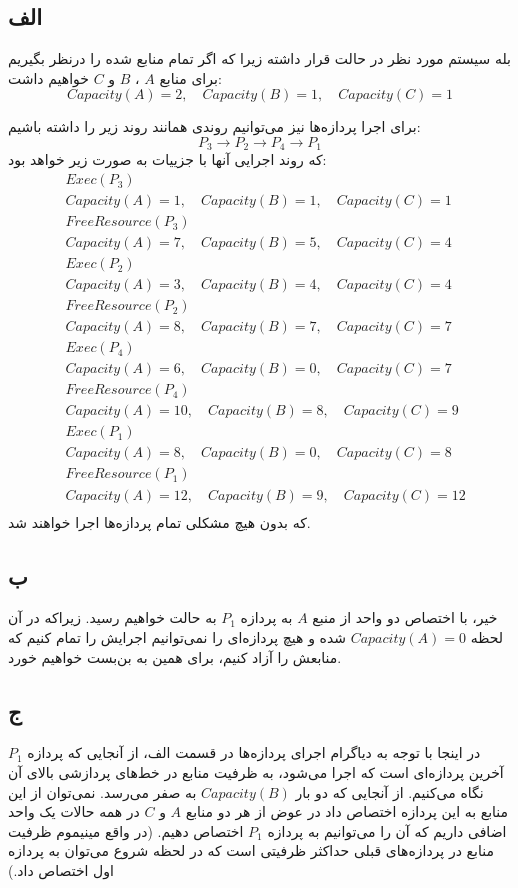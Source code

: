 \subsection*{الف}
بله سیستم مورد نظر در حالت
قرار داشته زیرا که اگر تمام منابع
شده را درنظر بگیریم برای منابع
$A$
،
$B$
و
$C$
خواهیم داشت:
\[
    Capacity(A) = 2, \quad Capacity(B) = 1, \quad Capacity(C) = 1
\]

برای اجرا پردازه‌ها نیز می‌توانیم روندی همانند روند زیر را داشته باشیم:
\[
    P_3 \to P_2 \to P_4 \to P_1    
\]
که روند اجرایی آنها با جزییات به صورت زیر خواهد بود:
\begin{align*}
    &Exec(P_3) \\
    &Capacity(A) = 1, \quad Capacity(B) = 1, \quad Capacity(C) = 1 \\
    &FreeResource(P_3) \\
    &Capacity(A) = 7, \quad Capacity(B) = 5, \quad Capacity(C) = 4 \\
    &Exec(P_2) \\
    &Capacity(A) = 3, \quad Capacity(B) = 4, \quad Capacity(C) = 4 \\
    &FreeResource(P_2) \\
    &Capacity(A) = 8, \quad Capacity(B) = 7, \quad Capacity(C) = 7 \\
    &Exec(P_4) \\
    &Capacity(A) = 6, \quad Capacity(B) = 0, \quad Capacity(C) = 7 \\
    &FreeResource(P_4) \\
    &Capacity(A) = 10, \quad Capacity(B) = 8, \quad Capacity(C) = 9 \\
    &Exec(P_1) \\
    &Capacity(A) = 8, \quad Capacity(B) = 0, \quad Capacity(C) = 8 \\
    &FreeResource(P_1) \\
    &Capacity(A) = 12, \quad Capacity(B) = 9, \quad Capacity(C) = 12 \\
\end{align*}
که بدون هیچ مشکلی تمام پردازه‌ها اجرا خواهند شد.

\subsection*{ب}
خیر، با اختصاص دو واحد از منبع
$A$
به پردازه
$P_1$
به حالت
خواهیم رسید. زیراکه در آن لحظه
$Capacity(A) = 0$
شده و هیچ پردازه‌ای را نمی‌توانیم اجرایش را تمام کنیم که منابعش را آزاد کنیم، برای همین به بن‌بست خواهیم خورد.

\subsection*{ج}
در اینجا با توجه به دیاگرام اجرای پردازه‌ها در قسمت الف، از آنجایی که پردازه
$P_1$
آخرین پردازه‌ای است که اجرا می‌شود، به ظرفیت منابع در خط‌های پردازشی بالای آن نگاه می‌کنیم. از آنجایی که دو بار
$Capacity(B)$
به صفر می‌رسد. نمی‌توان از این منابع به این پردازه اختصاص داد در عوض از هر دو منابع
$A$
و
$C$
در همه حالات یک واحد اضافی داریم که آن را می‌توانیم به پردازه 
$P_1$
اختصاص دهیم. (در واقع مینیموم ظرفیت منابع در پردازه‌های قبلی حداکثر ظرفیتی است که در لحظه شروع می‌توان به پردازه اول اختصاص داد.)